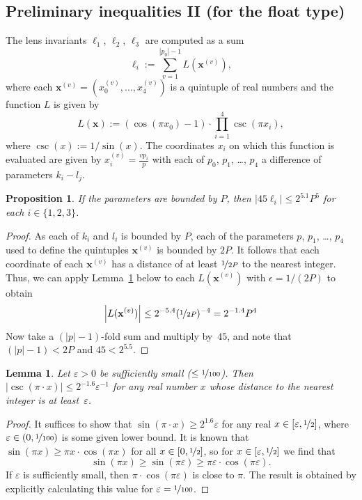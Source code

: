 \documentclass{article}
\newtheorem{lem}{Lemma}
\newtheorem{prop}{Proposition}
\newcommand{\abs}[1]{\left|#1\right|}
\renewcommand{\vec}[1]{\mathbf{#1}}
\begin{document}
\subsection*{Preliminary inequalities II (for the float type)}
The lens invariants \(\ell_1\), \(\ell_2\), \(\ell_3\) are computed as a sum
\begin{equation}\label{eq:ell}
  \ell_i := \sum_{v=1}^{\abs{p_0}-1} L(\vec x^{(v)}),
\end{equation}
where each \(\vec x^{(v)}=(x_0^{(v)},\dots,x_4^{(v)})\) is a quintuple of real numbers and the function \(L\) is given by
\begin{equation}\label{eq:L}
  L(\vec x) 
  := (\cos(\pi x_0)-1)
  · \textstyle\prod_{i=1}^{4} \csc(\pi x_i),
\end{equation}
where \(\csc(x) := 1/\sin(x)\).
The coordinates \(x_i\) on which this function is evaluated are given by \(x_i^{(v)} = \frac{v p_i}{p}\) with each of \(p_0\), \(p_1\), \dots, \(p_4\) a difference of parameters \(k_i-l_j\).  

\begin{prop}\label{prop:45ell}
  If the parameters are bounded by  \(P\), then \(\abs{45\ell_i} \leq 2^{5.1} P^5\) for each \(i\in\{1,2,3\}\).
\end{prop}
\begin{proof}
  As each of \(k_i\) and \(l_i\) is bounded by \(P\), each of the parameters \(p\), \(p_1\), \dots, \(p_4\) used to define the quintuples \(\vec x^{(v)}\) is bounded by \(2P\).  It follows that each coordinate of each \(\vec x^{(v)}\) has a distance of at least \(\nicefrac{1}{2P}\) to the nearest integer.  Thus, we can apply Lemma~\ref{lem:csc} below to each \(L(\vec x^{(v)})\) with \(\epsilon = 1/(2P)\) to obtain 
  \[
    \abs{L(\vec x^{(v)})}
    \leq 2^{-5.4}(\nicefrac{1}{2P})^{-4} = 2^{-1.4}P^4\\
  \]
  Now take a \((\abs{p}-1)\)-fold sum and multiply by~\(45\), and note that \((\abs{p}-1) < 2P\) and  \(45 < 2^{5.5}\).
\end{proof}

\begin{lem}\label{lem:csc}
  Let \(\varepsilon>0\) be sufficiently small (\(\leq \nicefrac{1}{100}\)).  Then
  \(\abs{\csc(\pi·x)} \leq 2^{-1.6} \varepsilon^{-1}\) for any real number \(x\) whose distance to the nearest integer is at least~\(\varepsilon\).
\end{lem}
\begin{proof}
  It suffices to show that \(\sin(\pi·x) \geq 2^{1.6} \varepsilon\) for any real \(x\in [\varepsilon,\nicefrac{1}{2}]\), where \(\varepsilon \in (0,\nicefrac{1}{100})\) is some given lower bound.  It is known that \(\sin(\pi x) \geq \pi x·\cos(\pi x)\) for all \(x\in [0,\nicefrac{1}{2}]\), so for \(x\in [\varepsilon,\nicefrac{1}{2}]\) we find that 
  \[
    \sin(\pi x) \geq \sin(\pi\varepsilon) \geq \pi\varepsilon·\cos(\pi\varepsilon).
  \]
  If \(\varepsilon\) is sufficiently small, then \(\pi·\cos(\pi\varepsilon)\) is close to \(\pi\).
  The result is obtained by explicitly calculating this value for \(\varepsilon = \nicefrac{1}{100}\).
%
%
\end{proof}
\end{document}
